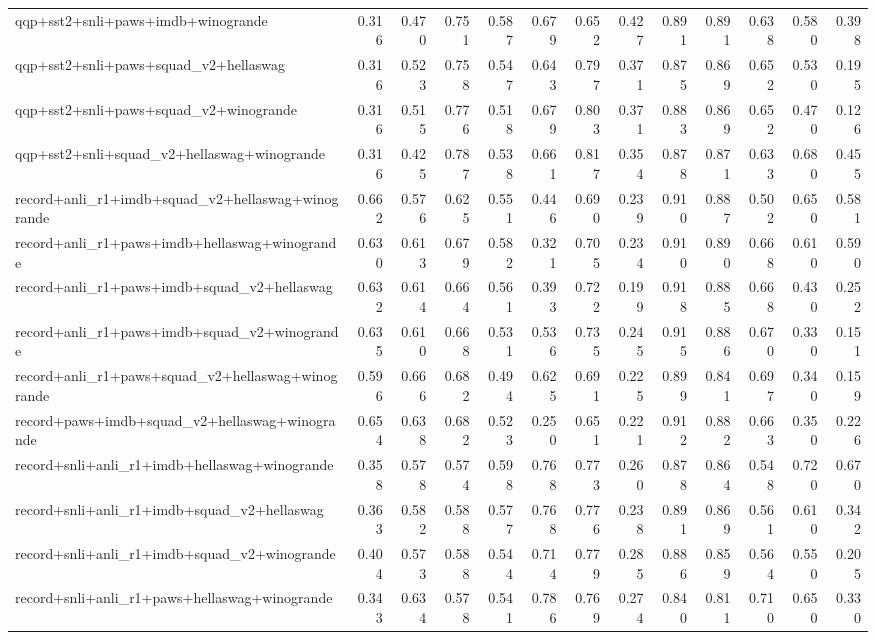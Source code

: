 \begin{table}[t]
\begin{tabular}{lrrrrrrrrrrrr}
    qqp+sst2+snli+paws+imdb+winogrande & 0.316 & 0.470 & 0.751 & 0.587 & 0.679 & 0.652 & 0.427 & 0.891 & 0.891 & 0.638 & 0.580 & 0.398 \\
    qqp+sst2+snli+paws+squad\_v2+hellaswag & 0.316 & 0.523 & 0.758 & 0.547 & 0.643 & 0.797 & 0.371 & 0.875 & 0.869 & 0.652 & 0.530 & 0.195 \\
    qqp+sst2+snli+paws+squad\_v2+winogrande & 0.316 & 0.515 & 0.776 & 0.518 & 0.679 & 0.803 & 0.371 & 0.883 & 0.869 & 0.652 & 0.470 & 0.126 \\
    qqp+sst2+snli+squad\_v2+hellaswag+winogrande & 0.316 & 0.425 & 0.787 & 0.538 & 0.661 & 0.817 & 0.354 & 0.878 & 0.871 & 0.633 & 0.680 & 0.455 \\
    record+anli\_r1+imdb+squad\_v2+hellaswag+winogrande & 0.662 & 0.576 & 0.625 & 0.551 & 0.446 & 0.690 & 0.239 & 0.910 & 0.887 & 0.502 & 0.650 & 0.581 \\
    record+anli\_r1+paws+imdb+hellaswag+winogrande & 0.630 & 0.613 & 0.679 & 0.582 & 0.321 & 0.705 & 0.234 & 0.910 & 0.890 & 0.668 & 0.610 & 0.590 \\
    record+anli\_r1+paws+imdb+squad\_v2+hellaswag & 0.632 & 0.614 & 0.664 & 0.561 & 0.393 & 0.722 & 0.199 & 0.918 & 0.885 & 0.668 & 0.430 & 0.252 \\
    record+anli\_r1+paws+imdb+squad\_v2+winogrande & 0.635 & 0.610 & 0.668 & 0.531 & 0.536 & 0.735 & 0.245 & 0.915 & 0.886 & 0.670 & 0.330 & 0.151 \\
    record+anli\_r1+paws+squad\_v2+hellaswag+winogrande & 0.596 & 0.666 & 0.682 & 0.494 & 0.625 & 0.691 & 0.225 & 0.899 & 0.841 & 0.697 & 0.340 & 0.159 \\
    record+paws+imdb+squad\_v2+hellaswag+winogrande & 0.654 & 0.638 & 0.682 & 0.523 & 0.250 & 0.651 & 0.221 & 0.912 & 0.882 & 0.663 & 0.350 & 0.226 \\
    record+snli+anli\_r1+imdb+hellaswag+winogrande & 0.358 & 0.578 & 0.574 & 0.598 & 0.768 & 0.773 & 0.260 & 0.878 & 0.864 & 0.548 & 0.720 & 0.670 \\
    record+snli+anli\_r1+imdb+squad\_v2+hellaswag & 0.363 & 0.582 & 0.588 & 0.577 & 0.768 & 0.776 & 0.238 & 0.891 & 0.869 & 0.561 & 0.610 & 0.342 \\
    record+snli+anli\_r1+imdb+squad\_v2+winogrande & 0.404 & 0.573 & 0.588 & 0.544 & 0.714 & 0.779 & 0.285 & 0.886 & 0.859 & 0.564 & 0.550 & 0.205 \\
    record+snli+anli\_r1+paws+hellaswag+winogrande & 0.343 & 0.634 & 0.578 & 0.541 & 0.786 & 0.769 & 0.274 & 0.840 & 0.811 & 0.710 & 0.650 & 0.330 \\

\end{tabular}
\end{table}
